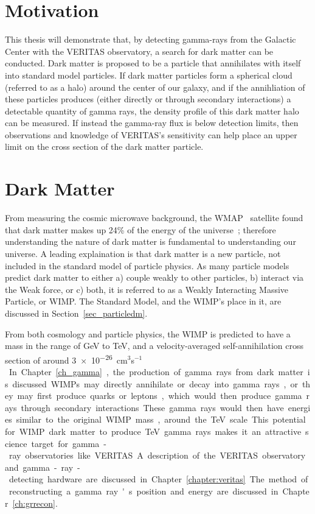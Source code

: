 \section{Motivation}
  This thesis will demonstrate that, by detecting gamma-rays from the Galactic Center with the VERITAS observatory, a search for dark matter can be conducted.
  Dark matter is proposed to be a particle that annihilates with itself into standard model particles.
  If dark matter particles form a spherical cloud (referred to as a halo) around the center of our galaxy, and if the annihliation of these particles produces (either directly or through secondary interactions) a detectable quantity of gamma rays, the density profile of this dark matter halo can be measured.
  If instead the gamma-ray flux is below detection limits, then observations and knowledge of VERITAS's sensitivity can help place an upper limit on the cross section of the dark matter particle.

\section{Dark Matter}

  From measuring the cosmic microwave background, the WMAP~\cite{wmap9year_obs} satellite found that dark matter makes up 24\% of the energy of the universe~\cite{pdg_2012}; therefore understanding the nature of dark matter is fundamental to understanding our universe.
  A leading explaination is that dark matter is a new particle, not included in the standard model of particle physics.
  As many particle models predict dark matter to either a) couple weakly to other particles, b) interact via the Weak force, or c) both, it is referred to as a Weakly Interacting Massive Particle, or WIMP.
  The Standard Model, and the WIMP's place in it, are discussed in Section~\ref{sec_particledm}.

  From both cosmology and particle physics, the WIMP is predicted to have a mass in the range of GeV to TeV, and a velocity-averaged self-annihilation cross section of around \nicetilde{}\SI{3e-26}{cm${}^3$s${}^{-1}$}.
  In Chapter~\ref{ch_gamma}, the production of gamma rays from dark matter is discussed.
  WIMPs may directly annihilate or decay into gamma rays, or they may first produce quarks or leptons, which would then produce gamma rays through secondary interactions.
  These gamma rays would then have energies similar to the original WIMP mass, around the TeV scale.
  This potential for WIMP dark matter to produce TeV gamma rays makes it an attractive science target for gamma-ray observatories like VERITAS.
  A description of the VERITAS observatory and gamma-ray-detecting hardware are discussed in Chapter~\ref{chapter:veritas}.
  The method of reconstructing a gamma ray's position and energy are discussed in Chapter~\ref{ch:grrecon}.

